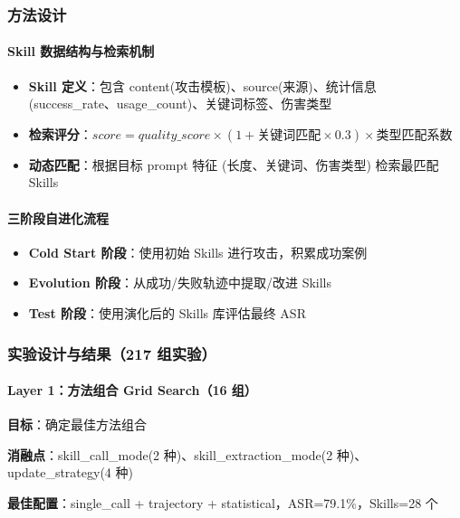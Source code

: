 \documentclass[12pt,a4paper]{article}
\newcommand{\highlight}[1]{\textcolor{primaryblue}{\textbf{#1}}}
\begin{document}
\subsubsection{方法设计}

\paragraph{Skill 数据结构与检索机制}

\begin{itemize}
    \item \highlight{Skill 定义}：包含 content(攻击模板)、source(来源)、统计信息 (success\_rate、usage\_count)、关键词标签、伤害类型
    \item \highlight{检索评分}：$score = quality\_score \times (1 + 关键词匹配 \times 0.3) \times 类型匹配系数$
    \item \highlight{动态匹配}：根据目标 prompt 特征 (长度、关键词、伤害类型) 检索最匹配 Skills
\end{itemize}

\paragraph{三阶段自进化流程}

\begin{itemize}
    \item \highlight{Cold Start 阶段}：使用初始 Skills 进行攻击，积累成功案例
    \item \highlight{Evolution 阶段}：从成功/失败轨迹中提取/改进 Skills
    \item \highlight{Test 阶段}：使用演化后的 Skills 库评估最终 ASR
\end{itemize}

\subsubsection{实验设计与结果（217 组实验）}

\paragraph{Layer 1：方法组合 Grid Search（16 组）}

\textbf{目标}：确定最佳方法组合

\textbf{消融点}：skill\_call\_mode(2 种)、skill\_extraction\_mode(2 种)、update\_strategy(4 种)

\textbf{最佳配置}：single\_call + trajectory + statistical，ASR=79.1\%，Skills=28 个
\end{document}
